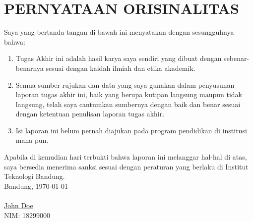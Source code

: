 \chapter*{PERNYATAAN ORISINALITAS}
\vspace{2cm}
Saya yang bertanda tangan di bawah ini menyatakan dengan sesungguhnya bahwa:
\begin{enumerate}
    \item Tugas Akhir ini adalah hasil karya saya sendiri yang dibuat dengan sebenar-benarnya sesuai dengan kaidah ilmiah dan etika akademik.
    \item Semua sumber rujukan dan data yang saya gunakan dalam penyusunan laporan tugas akhir ini, baik yang berupa kutipan langsung maupun tidak langsung, telah saya cantumkan sumbernya dengan baik dan benar sesuai dengan ketentuan penulisan laporan tugas akhir.
    \item Isi laporan ini belum pernah diajukan pada program pendidikan di institusi mana pun.
\end{enumerate}
Apabila di kemudian hari terbukti bahwa laporan ini melanggar hal-hal di atas, saya bersedia menerima sanksi sesuai dengan peraturan yang berlaku di Institut Teknologi Bandung.
\\[2cm]
Bandung, \today\\
\\[2cm]

\underline{John Doe} \\
NIM: 18299000
  